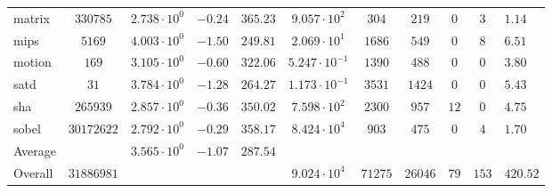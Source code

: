 \begin{tabular}{|l|c|HHc|c|c|c|c|cH|}
matrix        & $ 330785   $ & $ 2.738 \cdot 10^{0} $ & $ -0.24 $ & $ 365.23 $ & $ 9.057 \cdot 10^{2}  $ & $ 304   $ & $ 219   $ & $ 0   $ & $ 3   $ & $ 1.14    $ \\
mips          & $ 5169     $ & $ 4.003 \cdot 10^{0} $ & $ -1.50 $ & $ 249.81 $ & $ 2.069 \cdot 10^{1}  $ & $ 1686  $ & $ 549   $ & $ 0   $ & $ 8   $ & $ 6.51    $ \\
motion        & $ 169      $ & $ 3.105 \cdot 10^{0} $ & $ -0.60 $ & $ 322.06 $ & $ 5.247 \cdot 10^{-1} $ & $ 1390  $ & $ 488   $ & $ 0   $ & $ 0   $ & $ 3.80    $ \\
satd          & $ 31       $ & $ 3.784 \cdot 10^{0} $ & $ -1.28 $ & $ 264.27 $ & $ 1.173 \cdot 10^{-1} $ & $ 3531  $ & $ 1424  $ & $ 0   $ & $ 0   $ & $ 5.43    $ \\
sha           & $ 265939   $ & $ 2.857 \cdot 10^{0} $ & $ -0.36 $ & $ 350.02 $ & $ 7.598 \cdot 10^{2}  $ & $ 2300  $ & $ 957   $ & $ 12  $ & $ 0   $ & $ 4.75    $ \\
sobel         & $ 30172622 $ & $ 2.792 \cdot 10^{0} $ & $ -0.29 $ & $ 358.17 $ & $ 8.424 \cdot 10^{4}  $ & $ 903   $ & $ 475   $ & $ 0   $ & $ 4   $ & $ 1.70    $ \\
\hline
Average       & $          $ & $ 3.565 \cdot 10^{0} $ & $ -1.07 $ & $ 287.54 $ & $                     $ & $       $ & $       $ & $     $ & $     $ & $         $ \\
\hline
Overall       & $ 31886981 $ & $                    $ & $       $ & $        $ & $ 9.024 \cdot 10^{4}  $ & $ 71275 $ & $ 26046 $ & $ 79  $ & $ 153 $ & $ 420.52  $ \\
\hline
\end{tabular}
